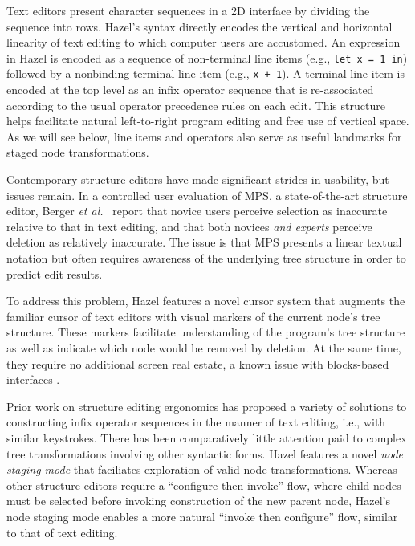 \documentclass[format=sigplan,dvipsnames,backend=bibtex]{acmart}
\newcommand{\Hazel}{\textsf{Hazel}\xspace}
\begin{document}
Text editors present character sequences in a 2D interface by dividing the
	sequence into rows.
\Hazel's syntax directly encodes the vertical and horizontal linearity of text
	editing to which computer users are accustomed.
An expression in \Hazel is encoded as a sequence of non-terminal line items
	(e.g., \texttt{let x = 1 in}) followed by a nonbinding terminal line item
	(e.g., \texttt{x + 1}). 
A terminal line item is encoded at the top level as an infix operator sequence that is 
re-associated according to the usual operator precedence rules on each edit. 
This structure helps facilitate natural left-to-right program editing and free use of
	vertical space.
As we will see below, line items and operators also serve as useful landmarks for staged
	node transformations.

Contemporary structure editors have made significant strides in usability, but
	issues remain.
In a controlled user evaluation of MPS, a state-of-the-art structure editor,
	Berger \emph{et al.}~ \cite{ProjEfficiency}
	report that novice users perceive selection as inaccurate relative to that in text
	editing, and that both novices \emph{and experts} perceive deletion as relatively inaccurate.
The issue is that MPS presents a linear textual notation but often requires awareness of the 
	underlying tree structure in order to predict edit results.

To address this problem, \Hazel features a novel cursor system that augments the familiar
	cursor of text editors with visual markers of the current node's tree structure.
These markers facilitate understanding of the program's tree structure as well as indicate
	which node would be removed by deletion.
At the same time, they require no additional screen real estate, a known issue with
	blocks-based interfaces \cite{BlocksFingertips}.

Prior work on structure editing ergonomics has proposed a variety of solutions to 
	constructing infix operator sequences in the manner of text editing, i.e., with similar 
	keystrokes.
There has been comparatively little attention paid to complex tree transformations involving other 
	syntactic forms.
\Hazel features a novel \emph{node staging mode} that faciliates exploration of valid
	node transformations.
Whereas other structure editors require a ``configure then invoke'' flow, where child
	nodes must be selected before invoking construction of the new parent node, \Hazel's
	node staging mode enables a more natural ``invoke then configure'' flow, similar to
	that of text editing.
\end{document}
